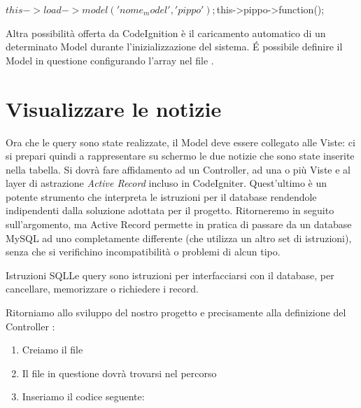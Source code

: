\begin{code}
$this->load->model('nome_model', 'pippo');

$this->pippo->function();
\end{code}

Altra possibilità offerta da CodeIgnition è il caricamento automatico di un determinato Model durante l'inizializzazione del sistema. \'E possibile definire il Model in questione configurando l'array  nel file .

\section*{Visualizzare le notizie}
Ora che le query sono state realizzate, il Model deve essere collegato alle Viste: ci si prepari quindi a rappresentare su schermo le due notizie che sono state inserite nella tabella. Si dovrà fare affidamento ad un Controller, ad una o più Viste e al layer di astrazione \emph{Active Record} incluso in CodeIgniter. Quest'ultimo è un potente strumento che interpreta le istruzioni per il database rendendole indipendenti dalla soluzione adottata per il progetto. Ritorneremo in seguito sull'argomento, ma Active Record permette in pratica di passare da un database MySQL ad uno completamente differente (che utilizza un altro set di istruzioni), senza che si verifichino incompatibilità o problemi di alcun tipo.

\begin{deftab}{Istruzioni SQL}{Le query sono istruzioni per interfacciarsi con il database, per cancellare, memorizzare o richiedere i record.}
\end{deftab}

Ritorniamo allo sviluppo del nostro progetto e precisamente alla definizione del Controller :

\begin{enumerate}
\item Creiamo il file  
\item Il file in questione dovrà trovarsi nel percorso 
\item Inseriamo il codice seguente:
\end{enumerate}

\label{list:classnews}

